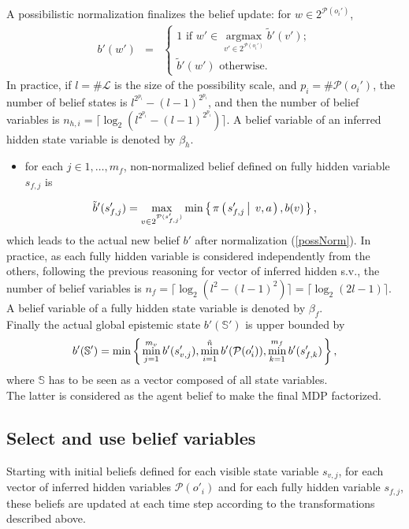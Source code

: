 A possibilistic normalization finalizes the belief update: for $w \in 2^{\mathcal{P}(o_i')}$,
\begin{eqnarray}
\label{possNorm} b'(w') & = & \left \{ \begin{array}{ccc} 1 \mbox{ if } w' \in \operatorname*{argmax}_{v' \in 2^{\mathcal{P}(o_i')}} \tilde{b}'(v'); \\
 \tilde{b}'(w') \mbox{ otherwise} . \end{array} \right.
\end{eqnarray} 
In practice, if $l=\# \mathcal{L}$ is the size of the possibility scale, and $p_i = \# \mathcal{P}(o_i')$, the number of belief states
is $l^{2^{p_i}} - (l-1)^{2^{p_i}}$, and then the number of belief variables is $n_{h,i} = \lceil \log_2(l^{2^{p_i}} - (l-1)^{2^{p_i}}) \rceil$.
A belief variable of an inferred hidden state variable is denoted by $\beta_h$.
\begin{itemize}
\item for each $j \in 1,\ldots,m_f$, non-normalized belief defined on fully hidden 
variable $s_{f,j}$ is 
\end{itemize}
\begin{equation}
\label{fullyHiddenBel}
\tilde{b}'(s_{f,j}') = \max_{v \in 2^{\mathcal{P}(s_{f,j}') }} \min \left\{ \left.  \pi \left( \left.  s_{f,j}' \, \right| \left. \, v,a \right. \right), b(v)  \right. \right\},
\end{equation}
which leads to the actual new belief $b'$ after normalization (\ref{possNorm}).
In practice, as each fully hidden variable is considered independently from the others, 
following the previous reasoning for vector of inferred hidden s.v., 
the number of belief variables is $n_f = \lceil \log_2(l^2 - (l-1)^2) \rceil = \lceil \log_2(2l-1) \rceil$.
A belief variable of a fully hidden state variable is denoted by $\beta_f$. \\

Finally the actual global epistemic state $b'(\mathbb{S}')$ is upper bounded by 
\begin{equation}
b'(\mathbb{S}') = \min \left\{ \left.  \min_{j=1}^{m_v} b'(s'_{v,j}), \min_{i=1}^{\tilde{n}} b'(\mathcal{P}(o_i')), \min_{k=1}^{m_f} b'(s_{f,k}')  \right. \right\},
\end{equation}
where $\mathbb{S}$ has to be seen as a vector composed of all state variables.\\
The latter is considered as the agent belief
to make the final MDP factorized.

\subsection{Select and use belief variables}
Starting with initial beliefs defined for each visible state variable $s_{v,j}$,
for each vector of inferred hidden variables $\mathcal{P}(o'_i)$ and for each fully 
hidden variable $s_{f,j}$, these beliefs are updated at each time step according to the
transformations described above.

